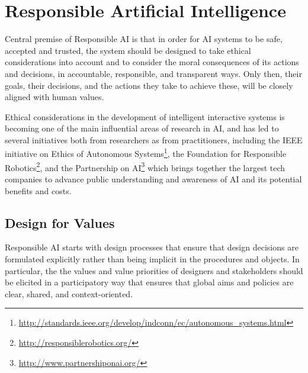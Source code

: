 \documentclass[twocolumn]{article}
\begin{document}
\section{Responsible Artificial Intelligence}\label{sec:rai}

Central premise of Responsible AI is that in order for AI systems to be safe, accepted and trusted, the system should be designed to take ethical considerations into account and to consider the moral consequences of its actions and decisions, in accountable, responsible, and transparent ways. Only then, their goals, their decisions, and the actions they take to achieve these, will be closely aligned with human values. 

Ethical considerations in the development of intelligent interactive systems is becoming one of the main influential areas of research in AI, and has led to several initiatives both from researchers as from practitioners, including the IEEE initiative on Ethics of Autonomous Systems\footnote{\url{http://standards.ieee.org/develop/indconn/ec/autonomous_systems.html}}, the Foundation for Responsible Robotics\footnote{\url{http://responsiblerobotics.org/}}, 
and the Partnership on AI\footnote{\url{http://www.partnershiponai.org/}} which brings together the largest tech companies to advance public understanding and awareness of AI and its potential benefits and costs.

\subsection{Design for Values}\label{sec:vsd}
Responsible AI starts with design processes that ensure that design decisions are formulated explicitly rather than being implicit in the procedures and objects. In particular, the the values and value priorities of designers and stakeholders should be elicited in a participatory way that ensures that global aims and policies are clear, shared, and context-oriented.
\end{document}
